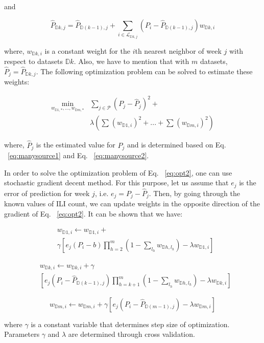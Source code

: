 and

\begin{equation}
\hat{P}_{\mathbb{D}k,j} = \hat{P}_{\mathbb{D}(k-1),j} + \sum_{i \in \mathcal{L}_{\mathbb{D}k,j}}{} (P_i - \hat{P}_{\mathbb{D}(k-1),j} )w_{\mathbb{D}k,i} 
\label{eq:manysource2}
\end{equation}

where, $w_{\mathbb{D}k,i}$ is a constant weight for the $i$th nearest neighbor of week $j$ with respect to datasets $\mathbb{D}k$. Also, we have to mention that with $m$ datasets, $\hat{P}_j = \hat{P}_{\mathbb{D}k,j}$. The following optimization problem can be solved to estimate these weights:

\begin{equation}
\begin{array}{ll}
\min_{w_{\mathbb{D}1,*}, ... ,w_{\mathbb{D}m,*}} & \sum_{j \in \mathcal{P}} {(P_j - \hat{P}_j)^2} +
\\ 
& \lambda (\sum_{}{}{{(w_{\mathbb{D}1,i})}^2}+...+\sum_{}{}{{(w_{\mathbb{D}m,i})}^2})
\end{array}
\label{eq:opt2}
\end{equation}

where, $\hat{P}_j$ is the estimated value for $P_j$ and is determined based on Eq. ~\ref{eq:manysource1} and Eq. ~\ref{eq:manysource2}.

In order to solve the optimization problem of Eq. ~\ref{eq:opt2}, one can use stochastic gradient decent method. For this purpose, let us assume that $e_j$ is the error of prediction for week $j$, i.e. $e_j = P_j - \hat{P}_j$. Then, by going through the known values of ILI count, we can update weights in the opposite direction of the gradient of Eq. ~\ref{eq:opt2}. It can be shown that we have:

\begin{equation}
\begin{array}{ll}
& w_{\mathbb{D}1,i} \leftarrow w_{\mathbb{D}1,i}+ \\
& \gamma \left [e_j(P_i - b)\prod_{h=2}^{m} (1- \sum_{l_h}w_{\mathbb{D}h,l_h})   - \lambda w_{\mathbb{D}1,i}  \right ]
\end{array}
\end{equation}

\begin{equation}
\begin{array}{ll}
& w_{\mathbb{D}k,i}  \leftarrow w_{\mathbb{D}k,i}+ \gamma  \\
& \left [e_j(P_i - \hat{P}_{\mathbb{D}(k-1),j})\prod_{h=k+1}^{m} (1- \sum_{l_h}w_{\mathbb{D}h,l_h})   - \lambda w_{\mathbb{D}k,i}  \right ]
\end{array}
\end{equation}

\begin{equation}
w_{\mathbb{D}m,i} \leftarrow w_{\mathbb{D}m,i}+ \gamma \left [e_j(P_i - \hat{P}_{\mathbb{D}(m-1),j}) - \lambda w_{\mathbb{D}m,i}  \right ]
\end{equation}

where $\gamma$ is a constant variable that determines step size of optimization. Parameters $\gamma$ and $\lambda$ are determined through cross validation.
